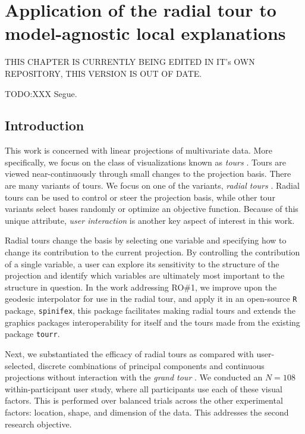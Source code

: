 \documentclass{template/monashthesis}
\begin{document}
\hypertarget{ch:cheem}{%
\chapter{Application of the radial tour to model-agnostic local explanations}\label{ch:cheem}}

THIS CHAPTER IS CURRENTLY BEING EDITED IN IT's OWN REPOSITORY, THIS VERSION IS OUT OF DATE.

TODO:XXX Segue.

\hypertarget{sec:intro}{%
\section{Introduction}\label{sec:intro}}

This work is concerned with linear projections of multivariate data. More specifically, we focus on the class of visualizations known as \emph{tours} \autocite{cook_grand_2008,lee_review_2021}. Tours are viewed near-continuously through small changes to the projection basis. There are many variants of tours. We focus on one of the variants, \emph{radial tours} \autocite{cook_manual_1997,spyrison_spinifex_2020}. Radial tours can be used to control or steer the projection basis, while other tour variants select bases randomly or optimize an objective function. Because of this unique attribute, \emph{user interaction} is another key aspect of interest in this work.

Radial tours change the basis by selecting one variable and specifying how to change its contribution to the current projection. By controlling the contribution of a single variable, a user can explore its sensitivity to the structure of the projection and identify which variables are ultimately most important to the structure in question. In the work addressing RO\#1, we improve upon the geodesic interpolator for use in the radial tour, and apply it in an open-source \texttt{R} package, \texttt{spinifex}, this package facilitates making radial tours and extends the graphics packages interoperability for itself and the tours made from the existing package \texttt{tourr}.

Next, we substantiated the efficacy of radial tours as compared with user-selected, discrete combinations of principal components \autocite{pearson_liii._1901} and continuous projections without interaction with the \emph{grand tour} \autocite{asimov_grand_1985}. We conducted an \(N=108\) within-participant user study, where all participants use each of these visual factors. This is performed over balanced trials across the other experimental factors: location, shape, and dimension of the data. This addresses the second research objective.
\end{document}
